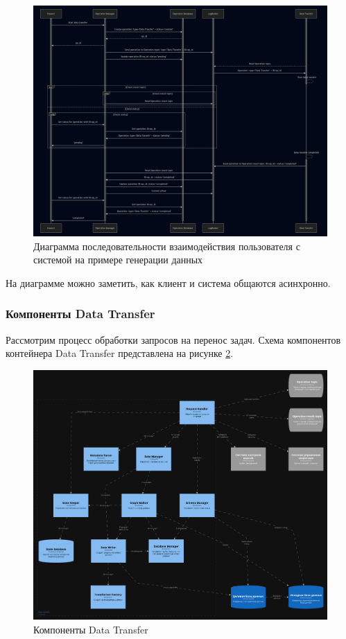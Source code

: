 \begin{figure}
  \includegraphics[scale=0.2]{./img/mermaid-sequence-User-MainSystem.png}
  \caption{Диаграмма последовательности взаимодействия пользователя с системой на примере генерации данных}
  \label{Sequence User-MainSystem}
\end{figure}

На диаграмме можно заметить, как клиент и система общаются асинхронно.

\subsubsection{Компоненты Data Transfer}

Рассмотрим процесс обработки запросов на перенос задач. Схема компонентов контейнера Data Transfer представлена на рисунке \ref{Data Transfer Components}.

\begin{figure}
  \includegraphics[scale=0.12]{./img/structurizr-DataTransferComponents.png}
  \caption{Компоненты Data Transfer}
  \label{Data Transfer Components}
\end{figure}

